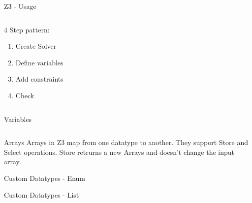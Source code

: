 \documentclass[t, ]{beamer}
\begin{document}
\begin{frame}{Z3 - Usage}
	
	
	\begin{columns}
		\begin{column}{0.4\textwidth}
			4 Step pattern:
			\begin{enumerate}
				\item Create Solver
				\item Define variables
				\item Add constraints
				\item Check
			\end{enumerate}
		\end{column}
		\begin{column}{0.6\textwidth}
			\pause
			
			
		\end{column}
		
	\end{columns}
\end{frame}


\begin{frame}{Variables}
	
	\begin{columns}
		\begin{column}{0.4\textwidth}
			
		\end{column}
		\begin{column}{0.6\textwidth}
			
			
		\end{column}
		
	\end{columns}
	
	
\end{frame}

\begin{frame}{Arrays}
	Arrays in Z3 map from one datatype to another. They support Store and Select operations. Store retrurns a new Arrays and doesn't change the input array.
	
	
\end{frame}

\begin{frame}{Custom Datatypes - Enum}
	
\end{frame}


\begin{frame}{Custom Datatypes - List}
	
\end{frame}
\end{document}
